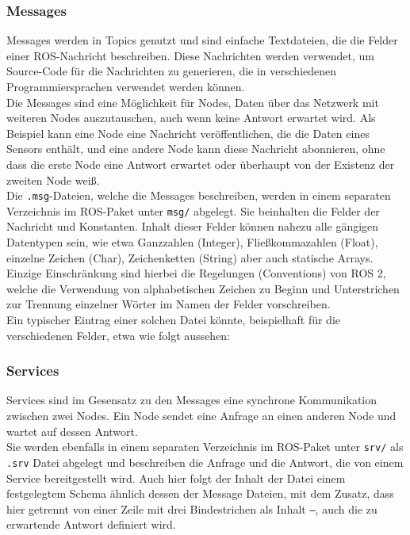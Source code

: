 \subsubsection{Messages}\label{subsubsec:ROS2Messages}
Messages werden in Topics genutzt und sind einfache Textdateien, die die Felder einer \ac{ROS}-Nachricht beschreiben. Diese Nachrichten werden verwendet, um Source-Code für die Nachrichten zu generieren, die in verschiedenen Programmiersprachen verwendet werden können.
\\

\noindent
Die Messages sind eine Möglichkeit für Nodes, Daten über das Netzwerk mit weiteren Nodes auszutauschen, auch wenn keine Antwort erwartet wird. Als Beispiel kann eine Node eine Nachricht veröffentlichen, die die Daten eines Sensors enthält, und eine andere Node kann diese Nachricht abonnieren, ohne dass die erste Node eine Antwort erwartet oder überhaupt von der Existenz der zweiten Node weiß.
\\

\noindent
Die \texttt{.msg}-Dateien, welche die Messages beschreiben, werden in einem separaten Verzeichnis im \ac{ROS}-Paket unter \texttt{msg/} abgelegt. Sie beinhalten die Felder der Nachricht und Konstanten. Inhalt dieser Felder können nahezu alle gängigen Datentypen sein, wie etwa Ganzzahlen (Integer), Fließkommazahlen (Float), einzelne Zeichen (Char), Zeichenketten (String) aber auch statische Arrays. Einzige Einschränkung sind hierbei die Regelungen (Conventions) von \ac{ROS} 2, welche die Verwendung von alphabetischen Zeichen zu Beginn und Unterstrichen zur Trennung einzelner Wörter im Namen der Felder vorschreiben.
\\

\noindent
Ein typischer Eintrag einer solchen Datei könnte, beispielhaft für die verschiedenen Felder, etwa wie folgt aussehen:\\

\subsubsection{Services}\label{subsubsec:ROS2Services}
Services sind im Gesensatz zu den Messages eine synchrone Kommunikation zwischen zwei Nodes. Ein Node sendet eine Anfrage an einen anderen Node und wartet auf dessen Antwort.
\\

\noindent
Sie werden ebenfalls in einem separaten Verzeichnis im \ac{ROS}-Paket unter \texttt{srv/} als \texttt{.srv} Datei abgelegt und beschreiben die Anfrage und die Antwort, die von einem Service bereitgestellt wird. Auch hier folgt der Inhalt der Datei einem festgelegtem Schema ähnlich dessen der Message Dateien, mit dem Zusatz, dass hier getrennt von einer Zeile mit drei Bindestrichen als Inhalt \texttt{---}, auch die zu erwartende Antwort definiert wird.
\\


